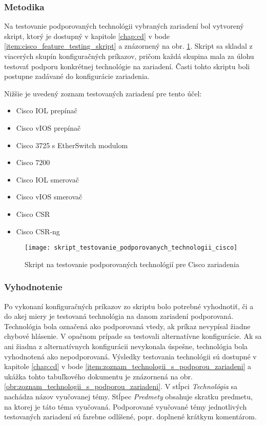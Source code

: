 \subsubsection{Metodika}

Na testovanie podporovaných technológii vybraných zariadení bol vytvorený skript, ktorý je dostupný v kapitole \ref{chap:cd} v bode \ref{item:cisco_feature_testing_skript} a znázornený na obr. \ref{obr:skript_testovanie_podporovanych_technologii_cisco}. Skript sa skladal z viacerých skupín konfiguračných príkazov, pričom každá skupina mala za úlohu testovať podporu konkrétnej technológie na zariadení. Časti tohto skriptu boli postupne zadávané do konfigurácie zariadenia.

Nižšie je uvedený zoznam testovaných zariadení pre tento účel:

\begin{itemize}[noitemsep]
    \item Cisco IOL prepínač
    \item Cisco vIOS prepínač
    \item Cisco 3725 s EtherSwitch modulom
    \item Cisco 7200
    \item Cisco IOL smerovač
    \item Cisco vIOS smerovač
    \item Cisco CSR
    \item Cisco CSR-ng
\end{itemize}

\begin{figure}
    \centering
    \texttt{[image: skript\_testovanie\_podporovanych\_technologii\_cisco]}
    \caption{Skript na testovanie podporovaných technológií pre Cisco zariadenia}
    \label{obr:skript_testovanie_podporovanych_technologii_cisco}
\end{figure}


\subsubsection{Vyhodnotenie}
\label{chap:testovanie_technologii_vyhodnotenie}

Po vykonaní konfiguračných príkazov zo skriptu bolo potrebné vyhodnotiť, či a do akej miery je testovaná technológia na danom zariadení podporovaná. Technológia bola označená ako podporovaná vtedy, ak príkaz nevypísal žiadne chybové hlásenie. V opačnom prípade sa testovali alternatívne konfigurácie. Ak sa ani žiadna z alternatívnych konfigurácii nevykonala úspešne, technológia bola vyhodnotená ako nepodporovaná. Výsledky testovania technológii sú dostupné v kapitole \ref{chap:cd} v bode \ref{item:zoznam_technologii_s_podporou_zariadeni} a ukážka tohto tabuľkového dokumentu je znázornená na obr. \ref{obr:zoznam_technologii_s_podporou_zariadeni}. V stĺpci \emph{Technológia} sa nachádza názov vyučovanej témy. Stĺpec \emph{Predmety} obsahuje skratku predmetu, na ktorej je táto téma vyučovaná. Podporované vyučované témy jednotlivých testovaných zariadení sú farebne odlíšené, popr. doplnené krátkym komentárom.

